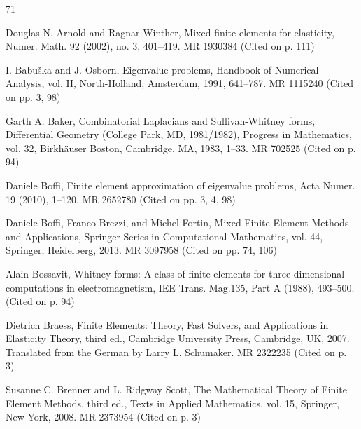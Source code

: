 \begin{MBSourceBibliography}{71}
\item\label{bib:source-15}Douglas N. Arnold and Ragnar Winther, Mixed finite elements for elasticity, Numer. Math. 92 (2002), no. 3, 401–419. MR 1930384 (Cited on p. 111)

\item\label{bib:source-16}I. Babuška and J. Osborn, Eigenvalue problems, Handbook of Numerical Analysis, vol. II, North-Holland, Amsterdam, 1991, 641–787. MR 1115240 (Cited on pp. 3, 98)

\item\label{bib:source-17}Garth A. Baker, Combinatorial Laplacians and Sullivan-Whitney forms, Differential Geometry (College Park, MD, 1981/1982), \newline Progress in Mathematics, vol. 32, Birkhäuser Boston, Cambridge, MA, 1983, 1–33. MR 702525 (Cited on p. 94)

\item\label{bib:source-18}Daniele Boffi, Finite element approximation of eigenvalue problems, Acta Numer. 19 (2010), 1–120. MR 2652780 (Cited on pp. 3, 4, 98)

\item\label{bib:source-19}Daniele Boffi, Franco Brezzi, and Michel Fortin, Mixed Finite Element Methods and Applications, Springer Series in Computational Mathematics, vol. 44, Springer, Heidelberg, 2013. MR 3097958 (Cited on pp. 74, 106)

\item\label{bib:source-20}Alain Bossavit, Whitney forms: A class of finite elements for three-dimensional computations in electromagnetism, IEE Trans. Mag.135, Part A (1988), 493–500. (Cited on p. 94)

\item\label{bib:source-21}Dietrich Braess, Finite Elements: Theory, Fast Solvers, and Applications in Elasticity Theory, third ed., Cambridge University Press, Cambridge, UK, 2007. Translated from the German by Larry L. Schumaker. MR 2322235 (Cited on p. 3)

\item\label{bib:source-22}Susanne C. Brenner and L. Ridgway Scott, The Mathematical Theory of Finite Element Methods, third ed., Texts in Applied Mathematics, vol. 15, Springer, New York, 2008. MR 2373954 (Cited on p. 3)


\end{MBSourceBibliography}
